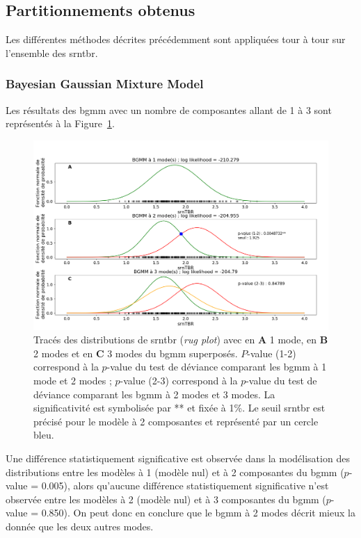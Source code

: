 \subsection{Partitionnements obtenus}

Les différentes méthodes décrites précédemment sont appliquées tour à tour sur l'ensemble des \gls{srntbr}.

\subsubsection{Bayesian Gaussian Mixture Model}

Les résultats des \gls{bgmm} avec un nombre de composantes allant de 1 à 3 sont représentés à la Figure~\ref{Figure:tbr_bgmm}. 

\begin{figure}[h!]
  \centering
	\includegraphics[width=1.0\linewidth]{figures/chapter-4/tbr-bgmm} 
  \caption[Résultats des \gls{bgmm} avec une à trois composantes.]{Tracés des distributions de \gls{srntbr} (\textit{rug plot}) avec en \textbf{A} 1 mode, en \textbf{B} 
	2 modes et en \textbf{C} 3 modes du \gls{bgmm} superposés. $P$-value (1-2) correspond
	à la $p$-value du test de déviance comparant les \gls{bgmm} à 1 mode et 2 modes ; $p$-value (2-3) correspond à la $p$-value du test de déviance comparant les \gls{bgmm}
	à 2 modes et 3 modes. La significativité est symbolisée par ** et fixée à 1\%. Le seuil \gls{srntbr} est précisé pour le modèle à 2 composantes et représenté par un cercle bleu.}
  \label{Figure:tbr_bgmm} 
\end{figure}

Une différence statistiquement significative est observée dans la modélisation des distributions entre les modèles à 1 (modèle nul) et à 2 composantes 
du \gls{bgmm} ($p$-value = 0.005), alors qu'aucune différence statistiquement significative n'est observée entre les modèles à 2 (modèle nul) 
et à 3 composantes du \gls{bgmm} ($p$-value = 0.850). On peut donc en conclure que le \gls{bgmm} à 2 modes décrit mieux la donnée que les deux
autres modes. 

